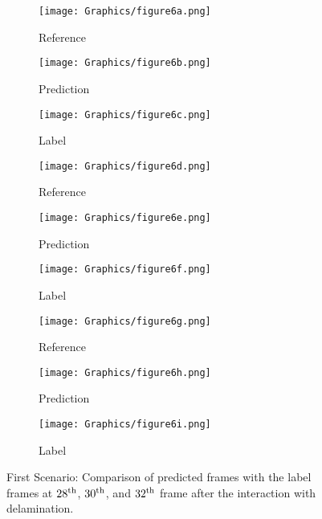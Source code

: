 \begin{figure} [!ht]
	\centering
	\begin{subfigure}[b]{0.32\textwidth}
		\centering
		\texttt{[image: Graphics/figure6a.png]}
		\caption{Reference}
		\label{fig:first_scenario_ref_28}
	\end{subfigure}
	\hfill
	\begin{subfigure}[b]{0.32\textwidth}
		\centering
		\texttt{[image: Graphics/figure6b.png]}
		\caption{Prediction}
		\label{fig:first_scenario_pred_28}
	\end{subfigure}
	\hfill
	\begin{subfigure}[b]{0.32\textwidth}
		\centering
		\texttt{[image: Graphics/figure6c.png]}
		\caption{Label}
		\label{fig:first_scenario_lab_28}
	\end{subfigure}	
	\hfill
	\begin{subfigure}[b]{0.32\textwidth}
		\centering
		\texttt{[image: Graphics/figure6d.png]}
		\caption{Reference}
		\label{fig:first_scenario_ref_30}
	\end{subfigure}
	\hfill
	\begin{subfigure}[b]{0.32\textwidth}
		\centering
		\texttt{[image: Graphics/figure6e.png]}
		\caption{Prediction}
		\label{fig:first_scenario_pred_30}
	\end{subfigure}
	\hfill
	\begin{subfigure}[b]{0.32\textwidth}
		\centering
		\texttt{[image: Graphics/figure6f.png]}
		\caption{Label}
		\label{fig:first_scenario_lab_30}
	\end{subfigure}

	\hfill
	\begin{subfigure}[b]{0.32\textwidth}
		\centering
		\texttt{[image: Graphics/figure6g.png]}
		\caption{Reference}
		\label{fig:first_scenario_ref_32}
	\end{subfigure}
	\hfill
	\begin{subfigure}[b]{0.32\textwidth}
	\centering
	\texttt{[image: Graphics/figure6h.png]}
	\caption{Prediction}
	\label{fig:first_scenario_pred_32}
	\end{subfigure}
	\hfill
	\begin{subfigure}[b]{0.32\textwidth}
	\centering
	\texttt{[image: Graphics/figure6i.png]}
	\caption{Label}
	\label{fig:first_scenario_lab_32}
	\end{subfigure}
	
	\caption{First Scenario: Comparison of predicted frames with the label 
		frames at $28\textsuperscript{th}$, $30\textsuperscript{th}$, and 
		$32\textsuperscript{th}$ frame after the interaction with delamination.}
	\label{fig:first_scenario}
\end{figure}
